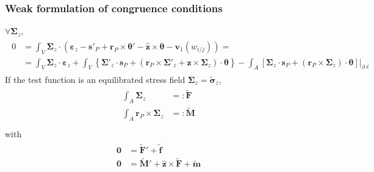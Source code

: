 \documentclass[letterpaper,10pt,english]{jupyterBook}
\begin{document}
\subsubsection{Weak formulation of congruence conditions}
\label{\detokenize{ch/solids/small-displacements-statics-beams-weak-form-general:weak-formulation-of-congruence-conditions}}\label{\detokenize{ch/solids/small-displacements-statics-beams-weak-form-general:solid-mechanics-intro-small-displacements-statics-beam-weak-form-weak-congruence}}
\sphinxAtStartPar
\(\forall \boldsymbol\Sigma_z\),
\begin{equation*}
\begin{split}\begin{aligned}
  0
  & = \int_{V} \boldsymbol\Sigma_z \cdot \left( \boldsymbol\varepsilon_z - \mathbf{s}'_{P} + \mathbf{r}_P \times \boldsymbol\theta' - \hat{\mathbf{z}} \times \boldsymbol\theta - \mathbf{v}_1(w_{i/j})\right) = \\
  & = \int_{V} \boldsymbol\Sigma_z \cdot \boldsymbol\varepsilon_z + \int_{V} \left\{ \boldsymbol{\Sigma}'_z \cdot \mathbf{s}_P + ( \mathbf{r}_P \times \boldsymbol\Sigma'_z + \hat{\mathbf{z}} \times \boldsymbol\Sigma_z ) \cdot \boldsymbol\theta \right\} - \int_{A} \left.\left[ \boldsymbol\Sigma_z \cdot \mathbf{s}_P + ( \mathbf{r}_P \times \boldsymbol\Sigma_z ) \cdot \boldsymbol\theta \right]\right|_{\partial \ell}
\end{aligned}\end{split}
\end{equation*}
\sphinxAtStartPar
If the test function is an equilibrated stress field \(\boldsymbol\Sigma_z = \widetilde{\boldsymbol{\sigma}}_z\),
\begin{equation*}
\begin{split}\begin{aligned}
 \int_{A} \boldsymbol\Sigma_z                     & =: \widetilde{\mathbf{F}} \\
 \int_{A} \mathbf{r}_P \times \boldsymbol\Sigma_z & =: \widetilde{\mathbf{M}} \\
\end{aligned}\end{split}
\end{equation*}
\sphinxAtStartPar
with
\begin{equation*}
\begin{split}\begin{aligned}
 \mathbf{0} & = \widetilde{\mathbf{F}}' + \widetilde{\mathbf{f}} \\
 \mathbf{0} & = \widetilde{\mathbf{M}}' + \hat{\mathbf{z}} \times \widetilde{\mathbf{F}} + \widetilde{\mathbf{m}} \\
\end{aligned}\end{split}
\end{equation*}
\end{document}
